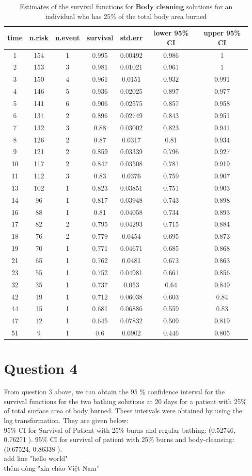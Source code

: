 \documentclass[a4paper, 12pt]{article}
\begin{document}
\begin{table}[!htbp]
\centering
\caption{Estimates of the survival functions for \textbf{Body cleaning} solutions for an individual who has 25\% of the total body area burned} 
\begin{tabular}{ccccccc}
\hline \hline
time&n.risk&n.event&survival&std.err&lower 95\% CI&upper 95\% CI\\
\hline
1&154&1&0.995&0.00492&0.986&1\\
2&153&3&0.981&0.01021&0.961&1\\
3&150&4&0.961&0.0151&0.932&0.991\\
4&146&5&0.936&0.02025&0.897&0.977\\
5&141&6&0.906&0.02575&0.857&0.958\\
6&134&2&0.896&0.02749&0.843&0.951\\
7&132&3&0.88&0.03002&0.823&0.941\\
8&126&2&0.87&0.0317&0.81&0.934\\
9&121&2&0.859&0.03339&0.796&0.927\\
10&117&2&0.847&0.03508&0.781&0.919\\
11&112&3&0.83&0.0376&0.759&0.907\\
13&102&1&0.823&0.03851&0.751&0.903\\
14&96&1&0.817&0.03948&0.743&0.898\\
16&88&1&0.81&0.04058&0.734&0.893\\
17&82&2&0.795&0.04293&0.715&0.884\\
18&76&2&0.779&0.0454&0.695&0.873\\
19&70&1&0.771&0.04671&0.685&0.868\\
21&65&1&0.762&0.0481&0.673&0.863\\
23&55&1&0.752&0.04981&0.661&0.856\\
32&35&1&0.737&0.053&0.64&0.849\\
42&19&1&0.712&0.06038&0.603&0.84\\
44&15&1&0.681&0.06886&0.559&0.83\\
47&12&1&0.645&0.07832&0.509&0.819\\
51&9&1&0.6&0.0902&0.446&0.805\\		
\hline \hline
\end{tabular}
\end{table}
\pagebreak

\section*{Question 4}
From question 3 above, we can obtain the 95 \% confidence interval for the survival functions for the two bathing solutions
at 20 days for a patient with 25\% of total surface area of body burned. These intervals were obtained by using the log transformation. They are given below:\\
95\% CI for Survival of Patient with 25\% burns and regular bathing: (0.52746, 0.76271 ).
95\% CI for survival of patient with 25\% burns and body-cleansing: (0.67524, 0.86338 ). 
\\add line "hello world"
\\thêm dòng "xin chào Việt Nam"
\end{document}
